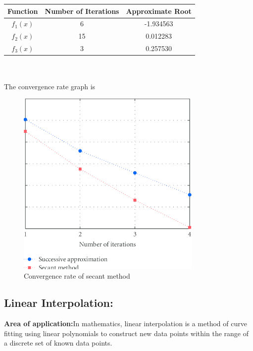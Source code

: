 \documentclass{article}
\begin{document}
\begin{tabular}{|c|c|c|}
	\hline 
	Function &
	Number of Iterations &
	Approximate Root
	\\ 
	\hline
	
	$f_1(x)$ & 6 &  -1.934563 \\
	\hline 
	$f_2(x)$ & 15 & 0.012283 \\
	\hline
	$f_3(x)$ & 3 & 0.257530 \\
	\hline
	
\end{tabular}\\
	\\[0.1in]
	The convergence rate graph is
	\begin{figure}[H]
		\caption{Convergence rate of secant method}
		\includegraphics[width=0.8\textwidth, height=0.6\textwidth]{secant_method.png}
	\end{figure}

	\subsection{Linear Interpolation:}
	{\bf Area of application:}In mathematics, linear interpolation is a method of curve fitting using linear polynomials to construct new data points within the range of a discrete set of known data points.
	
\end{document}
